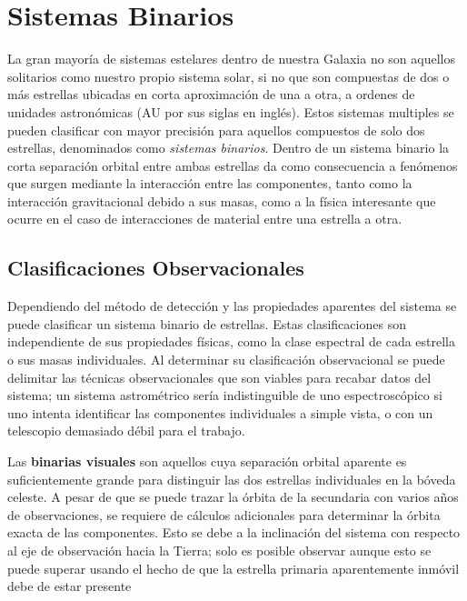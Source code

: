 \section{Sistemas Binarios}

La gran mayoría de sistemas estelares dentro de nuestra Galaxia no son aquellos
solitarios como nuestro propio sistema solar, si no que son compuestas de dos o
más estrellas ubicadas en corta aproximación de una a otra, a ordenes de
unidades astronómicas (AU por sus siglas en inglés). Estos sistemas multiples se
pueden clasificar con mayor precisión para aquellos compuestos de solo dos
estrellas, denominados como \textit{sistemas binarios}. Dentro de un sistema
binario la corta separación orbital entre ambas estrellas da como consecuencia a
fenómenos que surgen mediante la interacción entre las componentes, tanto como
la interacción gravitacional debido a sus masas, como a la física interesante
que ocurre en el caso de interacciones de material entre una estrella a otra. 

\subsection{Clasificaciones Observacionales}

Dependiendo del método de detección y las propiedades aparentes del sistema se
puede clasificar un sistema binario de estrellas. Estas clasificaciones son
independiente de sus propiedades físicas, como la clase espectral de cada
estrella o sus masas individuales. Al determinar su clasificación observacional
se puede delimitar las técnicas observacionales que son viables para recabar
datos del sistema; un sistema astrométrico sería indistinguible de uno
espectroscópico si uno intenta identificar las componentes individuales a simple
vista, o con un telescopio demasiado débil para el trabajo.

Las \textbf{binarias visuales} son aquellos cuya separación orbital aparente es
suficientemente grande para distinguir las dos estrellas individuales en la
bóveda celeste. A pesar de que se puede trazar la órbita de la secundaria con
varios años de observaciones, se requiere de cálculos adicionales para
determinar la órbita exacta de las componentes. Esto se debe a la inclinación
del sistema con respecto al eje de observación hacia la Tierra; solo es posible
observar  aunque esto se puede superar usando el hecho de que la estrella primaria
aparentemente inmóvil debe de estar presente  

